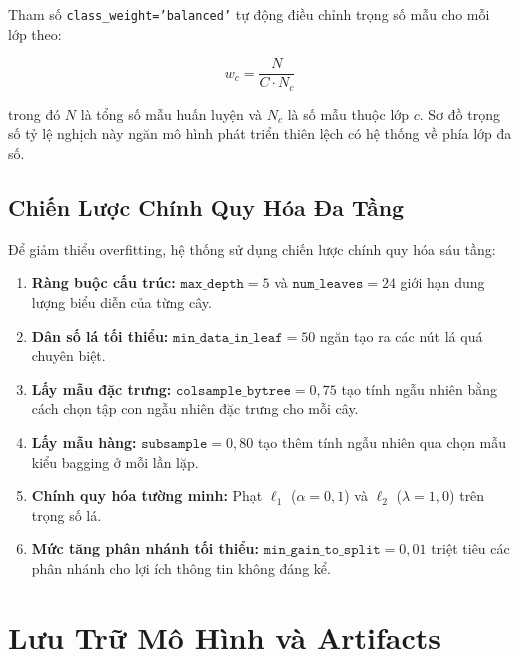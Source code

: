 \documentclass[a4paper,12pt]{article}
\begin{document}
Tham số \texttt{class\_weight='balanced'} tự động điều chỉnh trọng số mẫu cho mỗi lớp theo:

\begin{equation}
w_c = \frac{N}{C \cdot N_c}
\label{eq:balance}
\end{equation}

\noindent trong đó $N$ là tổng số mẫu huấn luyện và $N_c$ là số mẫu thuộc lớp $c$. Sơ đồ trọng số tỷ lệ nghịch này ngăn mô hình phát triển thiên lệch có hệ thống về phía lớp đa số.

\subsection{Chiến Lược Chính Quy Hóa Đa Tầng}

Để giảm thiểu overfitting, hệ thống sử dụng chiến lược chính quy hóa sáu tầng:

\begin{enumerate}
    \item \textbf{Ràng buộc cấu trúc:} $\texttt{max\_depth} = 5$ và $\texttt{num\_leaves} = 24$ giới hạn dung lượng biểu diễn của từng cây.
    \item \textbf{Dân số lá tối thiểu:} $\texttt{min\_data\_in\_leaf} = 50$ ngăn tạo ra các nút lá quá chuyên biệt.
    \item \textbf{Lấy mẫu đặc trưng:} $\texttt{colsample\_bytree} = 0,75$ tạo tính ngẫu nhiên bằng cách chọn tập con ngẫu nhiên đặc trưng cho mỗi cây.
    \item \textbf{Lấy mẫu hàng:} $\texttt{subsample} = 0,80$ tạo thêm tính ngẫu nhiên qua chọn mẫu kiểu bagging ở mỗi lần lặp.
    \item \textbf{Chính quy hóa tường minh:} Phạt $\ell_1$ ($\alpha = 0,1$) và $\ell_2$ ($\lambda = 1,0$) trên trọng số lá.
    \item \textbf{Mức tăng phân nhánh tối thiểu:} $\texttt{min\_gain\_to\_split} = 0,01$ triệt tiêu các phân nhánh cho lợi ích thông tin không đáng kể.
\end{enumerate}

\section{Lưu Trữ Mô Hình và Artifacts}
\label{sec:artifacts}
\end{document}
